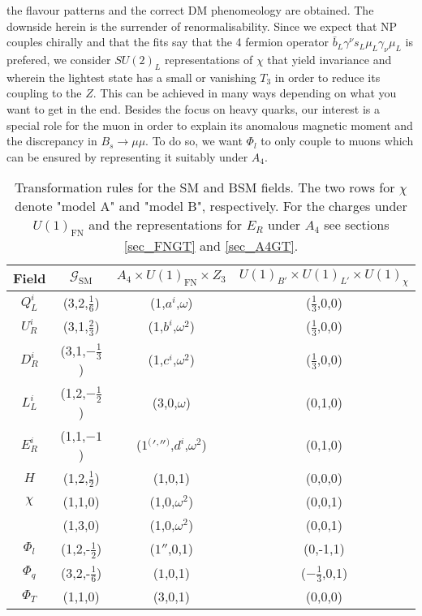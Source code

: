 the flavour patterns and the correct DM phenomeology are obtained. 
The downside herein is the surrender of renormalisability. Since we expect that NP couples chirally and that the fits say that the 4 fermion operator 
$\bar b_L \gamma^\nu s_L \mu_L \gamma_\nu \mu_L$ is prefered, we consider $SU(2)_L$ representations of $\chi$ that yield invariance and wherein the lightest
state has a small or vanishing $T_3$ in order to reduce its coupling to the $Z$. This can be achieved in many ways depending on what you want to get in the end. Besides the focus on heavy quarks,
our interest is a special role for the muon in order to explain its anomalous magnetic moment and the discrepancy in $B_s\rightarrow \mu\mu$. 
To do so, we want $\Phi_l$ to only couple to muons which can be ensured by representing it suitably under $A_4$. 
\begin{table}[t]
 \begin{tabular}{c|c|c|c}
  Field & $\mathcal{G}_\text{SM}$ & $A_4 \times U(1)_\text{FN} \times Z_3$ & $U(1)_{B'}\times U(1)_{L'}\times U(1)_\chi$\\
  \hline
  $Q^i_L$ & (3,2,$\frac16$) & (1,$a^i$,$\omega$) & ($\frac13$,0,0)\\
  $U^i_R$ & (3,1,$\frac23$) & (1,$b^i$,$\omega^2$)& ($\frac13$,0,0)\\
  $D^i_R$ & (3,1,$-\frac13$) & (1,$c^i$,$\omega^2$)& ($\frac13$,0,0)\\
  $L^i_L$ & (1,2,$-\frac12$) & (3,0,$\omega$)& (0,1,0)\\
  $E^i_R$ & (1,1,$-1$) & ($1 {^(} {'} {^,} '' {^)} $,$d^i$,$\omega^2$)& (0,1,0)\\
  $H$ & (1,2,$\frac12$) & (1,0,1)& (0,0,0)\\
  \hline
  $\chi$ & (1,1,0) & (1,0,$\omega^2$)& (0,0,1)\\
 & (1,3,0) & (1,0,$\omega^2$)&(0,0,1)\\
  $\Phi_l$ & (1,2,-$\frac12$) & ($1''$,0,1)& (0,-1,1)\\
  $\Phi_q$ & (3,2,-$\frac16$) & ($1$,0,1)& ($-\frac13$,0,1)\\
  \hline
  $\Phi_T$ & (1,1,0) & ($3$,0,1)& (0,0,0)\\
 \end{tabular}
\caption{Transformation rules for the SM and BSM fields. The two rows for $\chi$ denote "model A" and "model B", respectively. For the charges under $U(1)_\text{FN}$ and the representations for $E_R$ under $A_4$ 
see sections \ref{sec_FNGT} and \ref{sec_A4GT}.}
\label{tab_models}
\end{table}
